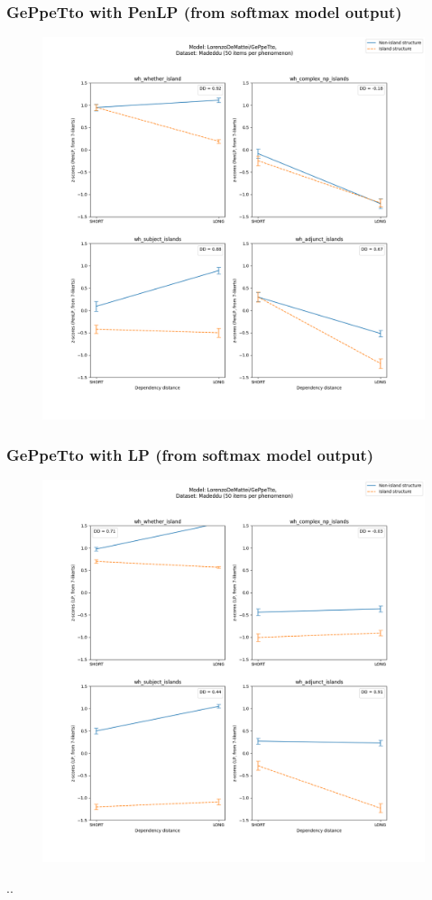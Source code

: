 \subsubsection{GePpeTto with PenLP (from softmax model output)}
\begin{figure}[h]
	\centering
	\includegraphics[width=1\textwidth]{images/AppendixA/Madeddu_wh_LorenzoDeMattei_GePpeTto_PenLP-zscores-likert-2022-07-11.png} 
\end{figure}

\clearpage
\subsubsection{GePpeTto with LP (from softmax model output)}
\begin{figure}[h]
	\centering
	\includegraphics[width=1\textwidth]{images/AppendixA/Madeddu_wh_LorenzoDeMattei_GePpeTto_LP-zscores-likert-2022-07-11.png} 
\end{figure}

..